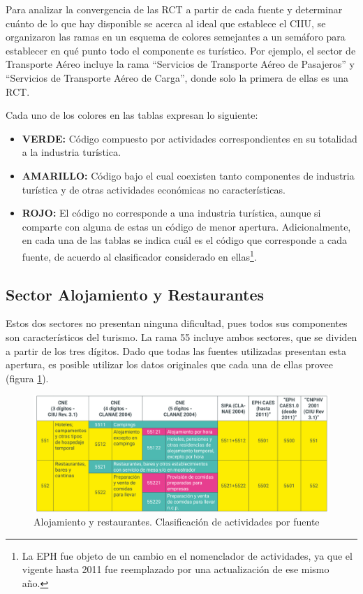 \documentclass[
  openany]{book}
\providecommand{\tightlist}{%
  \setlength{\itemsep}{0pt}\setlength{\parskip}{0pt}}
\begin{document}
Para analizar la convergencia de las RCT a partir de cada fuente y determinar cuánto de lo que hay disponible se acerca al ideal que establece el CIIU, se organizaron las ramas en un esquema de colores semejantes a un semáforo para establecer en qué punto todo el componente es turístico.
Por ejemplo, el sector de Transporte Aéreo incluye la rama ``Servicios de Transporte Aéreo de Pasajeros'' y ``Servicios de Transporte Aéreo de Carga'', donde solo la primera de ellas es una RCT.

Cada uno de los colores en las tablas expresan lo siguiente:

\begin{itemize}
\tightlist
\item
  \textbf{VERDE:} Código compuesto por actividades correspondientes en su totalidad a la industria turística.
\item
  \textbf{AMARILLO:} Código bajo el cual coexisten tanto componentes de industria turística y de otras actividades económicas no características.
\item
  \textbf{ROJO:} El código no corresponde a una industria turística, aunque si comparte con alguna de estas un código de menor apertura. Adicionalmente, en cada una de las tablas se indica cuál es el código que corresponde a cada fuente, de acuerdo al clasificador considerado en ellas\footnote{La EPH fue objeto de un cambio en el nomenclador de actividades, ya que el vigente hasta 2011 fue reemplazado por una actualización de ese mismo año.}.
\end{itemize}

\hypertarget{sector-alojamiento-y-restaurantes}{%
\subsection{Sector Alojamiento y Restaurantes}\label{sector-alojamiento-y-restaurantes}}

Estos dos sectores no presentan ninguna dificultad, pues todos sus componentes son característicos del turismo.
La rama 55 incluye ambos sectores, que se dividen a partir de los tres dígitos.
Dado que todas las fuentes utilizadas presentan esta apertura, es posible utilizar los datos originales que cada una de ellas provee (figura \ref{fig:empleofuentes5}).

\begin{figure}

{\centering \includegraphics[width=0.8\linewidth]{imagenes/figura3.5} 

}

\caption{Alojamiento y restaurantes. Clasificación de actividades por fuente}\label{fig:empleofuentes5}
\end{figure}
\end{document}
